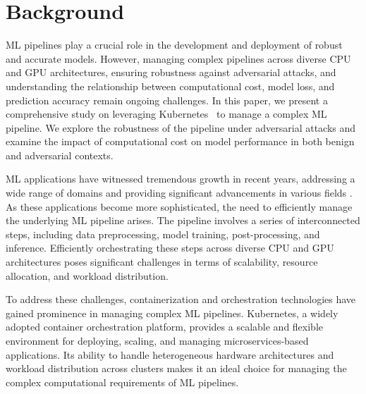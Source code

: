 \documentclass[conference]{IEEEtran}
\begin{document}
\section{Background}
ML pipelines play a crucial role in the development and deployment of robust and accurate models. However, managing complex pipelines across diverse CPU and GPU architectures, ensuring robustness against adversarial attacks, and understanding the relationship between computational cost, model loss, and prediction accuracy remain ongoing challenges. In this paper, we present a comprehensive study on leveraging Kubernetes~\cite{k8s} to manage a complex ML pipeline. We explore the robustness of the pipeline under adversarial attacks and examine the impact of computational cost on model performance in both benign and adversarial contexts.

ML applications have witnessed tremendous growth in recent years, addressing a wide range of domains and providing significant advancements in various fields \cite{li_general_2016, croce_reliable_2020, athalye_obfuscated_2018}. As these applications become more sophisticated, the need to efficiently manage the underlying ML pipeline arises. The pipeline involves a series of interconnected steps, including data preprocessing, model training, post-processing, and inference. Efficiently orchestrating these steps across diverse CPU and GPU architectures poses significant challenges in terms of scalability, resource allocation, and workload distribution.

To address these challenges, containerization and orchestration technologies have gained prominence in managing complex ML pipelines. Kubernetes, a widely adopted container orchestration platform, provides a scalable and flexible environment for deploying, scaling, and managing microservices-based applications. Its ability to handle heterogeneous hardware architectures and workload distribution across clusters makes it an ideal choice for managing the complex computational requirements of ML pipelines.



\end{document}
